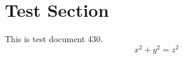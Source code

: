 \documentclass{article}
\begin{document}
\section{Test Section}
This is test document 430.
\begin{equation}
x^2 + y^2 = z^2
\end{equation}
\end{document}
